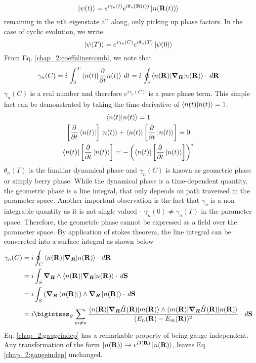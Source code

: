 \begin{equation}
 \ket{\psi(t)} = e^{i \gamma_{n}(t)} e^{i \theta_{n}(\mathbf{R}(t))} \ket{n(\mathbf{R}(t))}
\end{equation} remaining in the $n$th eigenstate all along, only picking up phase factors. In the case of cyclic evolution, we write
\begin{equation}
 \ket{\psi(T)} = e^{i \gamma_{n}(C)} e^{i \theta_{n}(T)} \ket{\psi(0)}
\end{equation}
From Eq. \eqref{chap_2:coeffslinercomb}, we note that
\begin{equation}
  \gamma_{n}(C) = i\,\int_{0}^{T}{\braket{n(t) | \frac{\partial}{\partial t} n(t)}\, dt} = i\, \oint_{c}{\braket{n(\mathbf{R})| \bm{\nabla_{R}} | n(\mathbf{R})} \cdot \, d\mathbf{R}}
\end{equation} $\gamma_{n}(C)$ is a real number and therefore $e^{i \gamma_{n}(C)}$ is a pure phase term. This simple fact can be demonstrated by taking the time-derivative 
of $\braket{n(t)|n(t)} = 1$.
\begin{gather*}
 \braket{n(t)|n(t)} = 1 \\
 \left[\frac{\partial}{\partial t}\bra{n(t)}\right]\ket{n(t)} + \bra{n(t)}\left[ \frac{\partial}{\partial t}\ket{n(t)}\right] = 0 \\
 \bra{n(t)}\left[\frac{\partial}{\partial t}\ket{n(t)}\right] = -\left(\bra{n(t)}\left[\frac{\partial}{\partial t}\ket{n(t)}\right]\right)^{*}
\end{gather*}
$\theta_{n}(T)$ is the familiar dynamical phase and $\gamma_{n}(C)$ is known as geometric phase or simply berry phase. While the dynamical phase is a time-dependent quantity,
the geometric phase is a line integral, that only depends on path traversed in the parameter space. Another important observation is the fact that $\gamma_{n}$ is a 
non-integrable quantity as it is not single valued - $\gamma_{n}(0) \neq \gamma_{n}(T)$ in the parameter space. Therefore, the geometric phase cannot be expressed as a field over
the parameter space. By application of stokes theorem, the line integral can be convereted into a surface integral as shown below
\begin{align}
 \gamma_{n}(C) &= i \oint_{C}{\braket{n(\mathbf{R})| \bm{\nabla_{R}} | n(\mathbf{R})} \cdot \, d\mathbf{R}} \nonumber \\
 &= i \int_{S}{\bm{\nabla_{R}} \wedge \braket{n(\mathbf{R})| \bm{\nabla_{R}} | n(\mathbf{R})} \cdot \, d\mathbf{S}} \\
 &= i \int_{S}{(\bm{\nabla_{R}}\bra{n(\mathbf{R})}) \wedge \bm{\nabla_{R}}\ket{n(\mathbf{R})} \cdot \, d\mathbf{S}} \nonumber \\
 \label{chap_2:gaugeindep} &= i \bigintsss_{S}{\,\sum_{m \neq n}{\frac{\braket{n(\mathbf{R})|\bm{\nabla_{R}}\hat{H}(\mathbf{R})|m(\mathbf{R})} \wedge \braket{m(\mathbf{R})|\bm{\nabla_{R}}\hat{H}(\mathbf{R})|n(\mathbf{R})}}{(E_{n}(\mathbf{R})- E_{m}(\mathbf{R}))^2}} \cdot \, d\mathbf{S}}
\end{align}
Eq. \eqref{chap_2:gaugeindep} has a remarkable property of being gauge independent. Any transformation of the form 
$\ket{n(\mathbf{R})} \rightarrow e^{i\delta(\mathbf{R})} \ket{n(\mathbf{R})}$, leaves Eq. \eqref{chap_2:gaugeindep} unchanged. 

